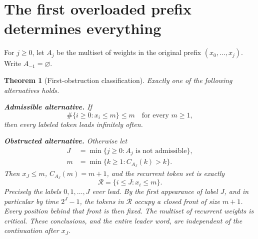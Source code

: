 \documentclass[11pt,letterpaper]{article}
\newtheorem{theorem}{Theorem}[section]
\theoremstyle{definition}
\newcommand{\core}{\mathcal R}
\begin{document}
\section{The first overloaded prefix determines everything}\label{sec:classification}
For $j\ge0$, let $A_j$ be the multiset of weights in the original prefix
$(x_0,\ldots,x_j)$. Write $A_{-1}=\varnothing$.

\begin{theorem}[First-obstruction classification]\label{thm:obstruction}
Exactly one of the following alternatives holds.

\textbf{Admissible alternative.} If
\begin{equation}\label{eq:global-condition}
 \boxed{\quad\#\{i\ge0:x_i\le m\}\le m\quad\text{for every }m\ge1,\quad}
\end{equation}
then every labeled token leads infinitely often.

\textbf{Obstructed alternative.} Otherwise let
\begin{align}
 J&=\min\{j\ge0:A_j\text{ is not admissible}\},\label{eq:J}\\
 m&=\min\{k\ge1:C_{A_J}(k)>k\}.\label{eq:m}
\end{align}
Then $x_J\le m$, $C_{A_J}(m)=m+1$, and the recurrent token set is exactly
\begin{equation}\label{eq:core}
 \boxed{\quad\core=\{i\le J:x_i\le m\}.\quad}
\end{equation}
Precisely the labels $0,1,\ldots,J$ ever lead. By the first appearance of
label $J$, and in particular by time $2^J-1$, the tokens in $\core$ occupy a
closed front of size $m+1$. Every position behind that front is then fixed.
The multiset of recurrent weights is critical. These conclusions, and the
entire leader word, are independent of the continuation after $x_J$.
\end{theorem}
\end{document}
